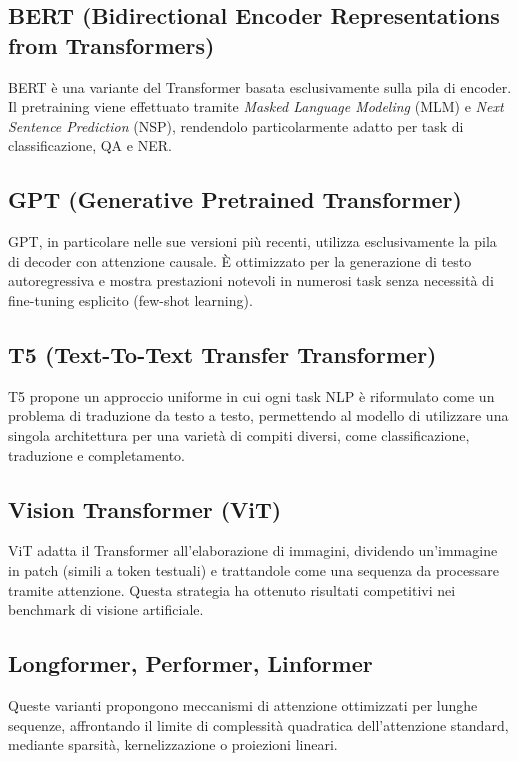 \subsection{BERT (Bidirectional Encoder Representations from Transformers)}
BERT è una variante del Transformer basata esclusivamente sulla pila di encoder. Il pretraining viene effettuato tramite \textit{Masked Language Modeling} (MLM) e \textit{Next Sentence Prediction} (NSP), rendendolo particolarmente adatto per task di classificazione, QA e NER.

\subsection{GPT (Generative Pretrained Transformer)}
GPT, in particolare nelle sue versioni più recenti, utilizza esclusivamente la pila di decoder con attenzione causale. È ottimizzato per la generazione di testo autoregressiva e mostra prestazioni notevoli in numerosi task senza necessità di fine-tuning esplicito (few-shot learning).

\subsection{T5 (Text-To-Text Transfer Transformer)}
T5 propone un approccio uniforme in cui ogni task NLP è riformulato come un problema di traduzione da testo a testo, permettendo al modello di utilizzare una singola architettura per una varietà di compiti diversi, come classificazione, traduzione e completamento.

\subsection{Vision Transformer (ViT)}
ViT adatta il Transformer all’elaborazione di immagini, dividendo un’immagine in patch (simili a token testuali) e trattandole come una sequenza da processare tramite attenzione. Questa strategia ha ottenuto risultati competitivi nei benchmark di visione artificiale.

\subsection{Longformer, Performer, Linformer}
Queste varianti propongono meccanismi di attenzione ottimizzati per lunghe sequenze, affrontando il limite di complessità quadratica dell’attenzione standard, mediante sparsità, kernelizzazione o proiezioni lineari.

